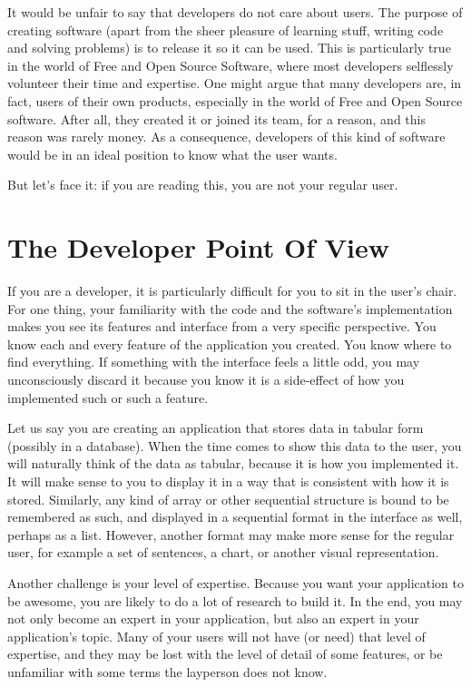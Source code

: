 It would be unfair to say that developers do not care about users. The purpose
of creating software (apart from the sheer pleasure of learning stuff,
writing code and solving problems) is to release it so it can be used. This is
particularly true in the world of Free and Open Source Software, where most
developers selflessly volunteer their time and expertise. One might argue that
many developers are, in fact, users of their own products, especially in the
world of Free and Open Source software. After all, they created it or joined
its team, for a reason, and this reason was rarely money. As a consequence,
developers of this kind of software would be in an ideal position to know what
the user wants.

But let's face it: if you are reading this, you are not your regular user.

\section*{The Developer Point Of View}

If you are a developer, it is particularly difficult for you to sit in the user's chair. For one
thing, your familiarity with the code and the software's implementation makes
you see its features and interface from a very specific perspective. You
know each and every feature of the application you created. You know where to
find everything. If something with the interface feels a little odd, you may
unconsciously discard it because you know it is a side-effect of how you
implemented such or such a feature.

Let us say you are creating an application that stores data in tabular form
(possibly in a database). When the time comes to show this data to the user, you
will naturally think of the data as tabular, because it is how you implemented
it. It will make sense to you to display it in a way that is consistent with how
it is stored. Similarly, any kind of array or other sequential structure is
bound to be remembered as such, and displayed in a sequential format in the
interface as well, perhaps as a list. However, another format may make more
sense for the regular user, for example a set of sentences, a chart, or another
visual representation.

Another challenge is your level of expertise. Because you want your
application to be awesome, you are likely to do a lot of research to build it.
In the end, you may not only become an expert in your application, but also an
expert in your application's topic. Many of your users will not have (or need)
that level of expertise, and they may be lost with the level of detail of some
features, or be unfamiliar with some terms the layperson does not know.


